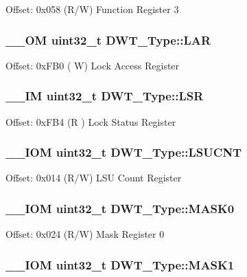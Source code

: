 Offset\-: 0x058 (R/\-W) Function Register 3 \hypertarget{struct_d_w_t___type_a4b8037802a3b25e367f0977d86f754ad}{
\subsubsection[{L\-A\-R}]{\setlength{\rightskip}{0pt plus 5cm}\-\_\-\-\_\-\-O\-M uint32\-\_\-t D\-W\-T\-\_\-\-Type\-::\-L\-A\-R}}\label{struct_d_w_t___type_a4b8037802a3b25e367f0977d86f754ad}
Offset\-: 0x\-F\-B0 ( W) Lock Access Register \hypertarget{struct_d_w_t___type_a4281befcc19ee69afdd50801cb1c9bcf}{
\subsubsection[{L\-S\-R}]{\setlength{\rightskip}{0pt plus 5cm}\-\_\-\-\_\-\-I\-M uint32\-\_\-t D\-W\-T\-\_\-\-Type\-::\-L\-S\-R}}\label{struct_d_w_t___type_a4281befcc19ee69afdd50801cb1c9bcf}
Offset\-: 0x\-F\-B4 (R ) Lock Status Register \hypertarget{struct_d_w_t___type_acc05d89bdb1b4fe2fa499920ec02d0b1}{
\subsubsection[{L\-S\-U\-C\-N\-T}]{\setlength{\rightskip}{0pt plus 5cm}\-\_\-\-\_\-\-I\-O\-M uint32\-\_\-t D\-W\-T\-\_\-\-Type\-::\-L\-S\-U\-C\-N\-T}}\label{struct_d_w_t___type_acc05d89bdb1b4fe2fa499920ec02d0b1}
Offset\-: 0x014 (R/\-W) L\-S\-U Count Register \hypertarget{struct_d_w_t___type_a821eb5e71f340ec077efc064cfc567db}{
\subsubsection[{M\-A\-S\-K0}]{\setlength{\rightskip}{0pt plus 5cm}\-\_\-\-\_\-\-I\-O\-M uint32\-\_\-t D\-W\-T\-\_\-\-Type\-::\-M\-A\-S\-K0}}\label{struct_d_w_t___type_a821eb5e71f340ec077efc064cfc567db}
Offset\-: 0x024 (R/\-W) Mask Register 0 \hypertarget{struct_d_w_t___type_aabf94936c9340e62fed836dcfb152405}{
\subsubsection[{M\-A\-S\-K1}]{\setlength{\rightskip}{0pt plus 5cm}\-\_\-\-\_\-\-I\-O\-M uint32\-\_\-t D\-W\-T\-\_\-\-Type\-::\-M\-A\-S\-K1}}\label{struct_d_w_t___type_aabf94936c9340e62fed836dcfb152405}
